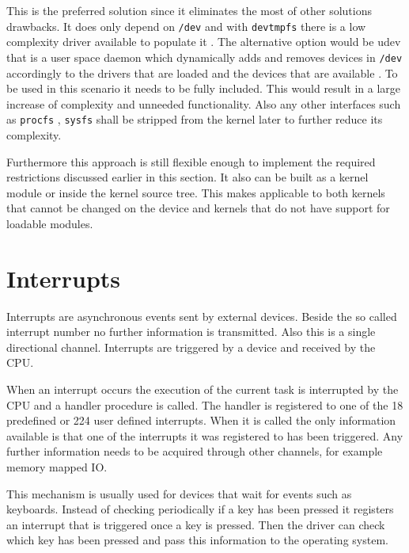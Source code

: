 \documentclass[
a4paper,
12pt,
notitlepage,
parskip=half,
DIV=11,
]{scrbook}
\begin{document}
		This is the preferred solution since it eliminates the most of other solutions drawbacks.
		It does only depend on \texttt{/dev} and with \texttt{devtmpfs} there is a low complexity driver available to populate it \citep{devtmpfs}.
		The alternative option would be udev that is a user space daemon which dynamically adds and removes devices in \texttt{/dev} accordingly to the drivers that are loaded and the devices that are available \citep{udev}.
		To be used in this scenario it needs to be fully included.
		This would result in a large increase of complexity and unneeded functionality.
		Also any other interfaces such as \texttt{procfs} \citep{procfs}, \texttt{sysfs} \citep{sysfs} shall be stripped from the kernel later to further reduce its complexity.
		
		Furthermore this approach is still flexible enough to implement the required restrictions discussed earlier in this section.
		It also can be built as a kernel module or inside the kernel source tree.
		This makes applicable to both kernels that cannot be changed on the device and kernels that do not have support for loadable modules.
		
		\section{Interrupts}
		\label{irq}
		
		Interrupts are asynchronous events sent by external devices.
		Beside the so called interrupt number no further information is transmitted.
		Also this is a single directional channel.
		Interrupts are triggered by a device and received by the CPU.
		
		When an interrupt occurs the execution of the current task is interrupted by the CPU and a handler procedure is called.
		The handler is registered to one of the 18 predefined or 224 user defined interrupts.
		When it is called the only information available is that one of the interrupts it was registered to has been triggered.
		Any further information needs to be acquired through other channels, for example memory mapped IO. \citep{intelmanual}
		
		This mechanism is usually used for devices that wait for events such as keyboards.
		Instead of checking periodically if a key has been pressed it registers an interrupt that is triggered once a key is pressed.
		Then the driver can check which key has been pressed and pass this information to the operating system.
		
\end{document}
